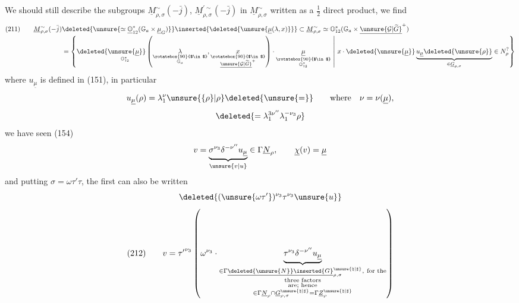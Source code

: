 We should still describe the subgroups
$\underline M_{\rho,\sigma}^{\sim}(-\bar j)$,
$\underline M_{\rho,\sigma}^{\prime\sim}(-\bar j)$
in $\underline M_{\rho,\sigma}^{\sim}$ written as a
$\frac12$ direct product, we find
\[
\begin{aligned}
(211)\qquad
\underline M_{\rho,\sigma}^{\sim}(-\bar j)
&\deleted{\unsure{\simeq\underline{\mathbb O}_{12}^{*}
(\mathbb G_a\times\underline\mu_G)}}
\inserted{\deleted{\unsure{\underline\mu(\lambda,x)}}}
\subset \underline M_{\rho,\sigma}^{\sim}
\simeq \mathbb O_{12}^{*}
(\mathbb G_a\times\underline{\unsure{\mathcal G|\widetilde G}}^{+})
\\[-1pt]
&=\left\{
\deleted{\underset{\mathbb O_{12}^{*}}
{\unsure{\underline\mu}}}
\left(
\underset{\substack{\rotatebox{90}{$\in$}\\\mathbb G_a}}{\lambda},
\underset{\substack{\rotatebox{90}{$\in$}\\
\underline{\unsure{\mathcal G|\widetilde G}}^{+}}}{x}
\right)\cdot
\underset{\substack{\rotatebox{90}{$\in$}\\
\mathbb O_{12}^{*}}}{\underline\mu}
\ \middle|\ x\cdot\deleted{\unsure{\underline\mu}}
\underbrace{u_{\underline\mu}\deleted{\unsure{\rho}}}
_{\in\underline G_{\rho,\sigma}}
\in N_\rho^{?}\right\}
\end{aligned}
\]
where $u_{\underline\mu}$ is defined in (151), in particular
\[
u_{\underline\mu}(\rho)=\lambda_1^{\nu}
\unsure{\{\rho\}|\rho}\deleted{\unsure{=}}
\qquad\text{where}\quad \nu=\nu(\underline\mu),
\]
\[
\deleted{=\lambda_1^{3\nu''}\lambda_1^{-\nu_3}\rho}
\]
we have seen (154)
\[
v=\underbrace{\sigma^{\nu_3}\delta^{-\nu''}u_{\underline\mu}}
_{\unsure{v|u}}\in\Gamma\underline N_\rho,
\qquad \underline\chi(v)=\underline\mu
\]
and putting $\sigma=\omega\tau'\tau$, the first
 can also be written
\[
\deleted{(\unsure{\omega\tau'})^{\nu_3}\tau^{\nu_3}\unsure{u}}
\]
\[
(212)\qquad
v={\tau'}^{\nu_3}\left(\omega^{\nu_3}\cdot
\underbrace{\tau^{\nu_3}\delta^{-\nu''}u_{\underline\mu}}
_{\substack{
\in\Gamma\underline{\deleted{\unsure{N}}\inserted{G}}
_{\rho,\sigma}^{\unsure{\natural|\sharp}},\ \text{for the}\\
\text{three factors}\\
\text{are; hence}\\
\in\Gamma\underline N_\rho\cap
\underline G_{\rho,\sigma}^{\unsure{\natural|\sharp}}
=\Gamma\underline Z_\rho^{\unsure{\natural|\sharp}}
}}\right)
\]

